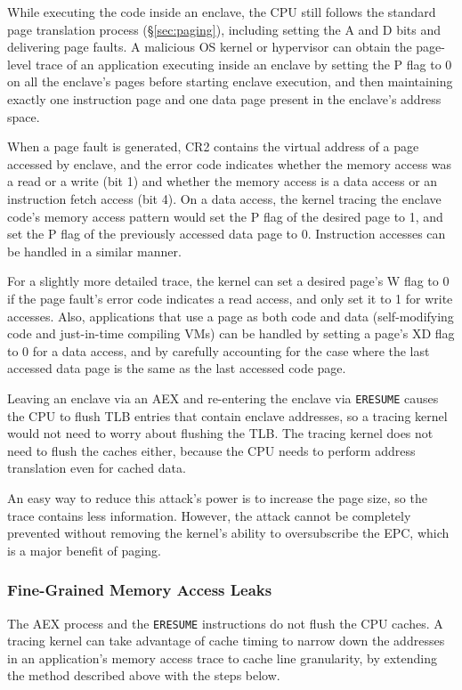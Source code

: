 While executing the code inside an enclave, the CPU still follows the standard
page translation process (\S \ref{sec:paging}), including setting the A and D
bits and delivering page faults. A malicious OS kernel or hypervisor can
obtain the page-level trace of an application executing inside an enclave by
setting the P flag to 0 on all the enclave's pages before starting enclave
execution, and then maintaining exactly one instruction page and one data page
present in the enclave's address space.

When a page fault is generated, CR2 contains the virtual address of a page
accessed by enclave, and the error code indicates whether the memory access was
a read or a write (bit 1) and whether the memory access is a data access or
an instruction fetch access (bit 4). On a data access, the kernel tracing the
enclave code's memory access pattern would set the P flag of the desired page
to 1, and set the P flag of the previously accessed data page to 0. Instruction
accesses can be handled in a similar manner.

For a slightly more detailed trace, the kernel can set a desired page's W flag
to 0 if the page fault's error code indicates a read access, and only set it to
1 for write accesses. Also, applications that use a page as both code and data
(self-modifying code and just-in-time compiling VMs) can be handled by setting
a page's XD flag to 0 for a data access, and by carefully accounting for the
case where the last accessed data page is the same as the last accessed code
page.

Leaving an enclave via an AEX and re-entering the enclave via \texttt{ERESUME}
causes the CPU to flush TLB entries that contain enclave addresses, so a
tracing kernel would not need to worry about flushing the TLB. The tracing
kernel does not need to flush the caches either, because the CPU needs to
perform address translation even for cached data.

An easy way to reduce this attack's power is to increase the page size, so the
trace contains less information. However, the attack cannot be completely
prevented without removing the kernel's ability to oversubscribe the EPC,
which is a major benefit of paging.

\subsubsection{Fine-Grained Memory Access Leaks}

The AEX process and the \texttt{ERESUME} instructions do not flush the CPU
caches. A tracing kernel can take advantage of cache timing to narrow down
the addresses in an application's memory access trace to cache line
granularity, by extending the method described above with the steps below.


